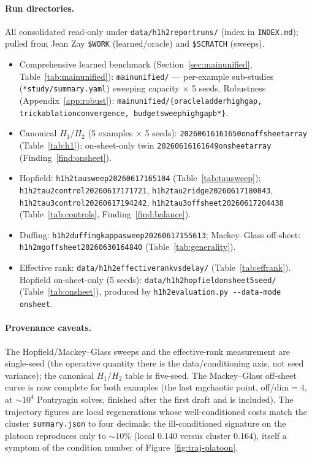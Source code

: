 \documentclass[11pt]{article}
\renewcommand{\_}{\discretionary{\textunderscore}{}{\textunderscore}}
\theoremstyle{plain}
\theoremstyle{definition}
\begin{document}
\paragraph{Run directories.} All consolidated read-only under \texttt{data/h1h2\_report\_runs/}
(index in \texttt{INDEX.md}); pulled from Jean Zay \texttt{\$WORK} (learned/oracle) and
\texttt{\$SCRATCH} (sweeps).
\begin{itemize}\setlength{\itemsep}{1pt}
\item Comprehensive learned benchmark (Section~\ref{sec:mainunified},
Table~\ref{tab:mainunified}): \texttt{main\_unified/} --- per-example sub-studies
(\texttt{*\_study/summary.yaml}) sweeping capacity $\times$ 5 seeds. Robustness
(Appendix~\ref{app:robust}): \texttt{main\_unified/\{oracle\_ladder\_high\_gap,
trick\_ablation\_convergence, budget\_sweep\_high\_gap\_b*\}}.
\item Canonical $H_1/H_2$ (5 examples $\times$ 5 seeds): \texttt{20260616\_161650\_on\_off\_sheet\_array}
(Table~\ref{tab:h1}); on-sheet-only twin \texttt{20260616\_161649\_on\_sheet\_array}
(Finding~\ref{find:onsheet}).
\item Hopfield: \texttt{h1h2\_tau\_sweep\_20260617\_165104} (Table~\ref{tab:tausweep});
\texttt{h1h2\_tau2\_control\_20260617\_171721}, \texttt{h1h2\_tau2\_ridge\_20260617\_180843},
\texttt{h1h2\_tau3\_control\_20260617\_194242}, \texttt{h1h2\_tau3\_offsheet\_20260617\_204438}
(Table~\ref{tab:controls}, Finding~\ref{find:balance}).
\item Duffing: \texttt{h1h2\_duffing\_kappa\_sweep\_20260617\_155613}; Mackey--Glass off-sheet:
\texttt{h1h2\_mg\_offsheet\_20260630\_164840} (Table~\ref{tab:generality}).
\item Effective rank: \texttt{data/h1h2\_effective\_rank\_vs\_delay/} (Table~\ref{tab:effrank}).
Hopfield on-sheet-only (5 seeds): \texttt{data/h1h2\_hopfield\_onsheet\_5seed/}
(Table~\ref{tab:onsheet}), produced by \texttt{h1h2\_evaluation.py -\/-data-mode on\_sheet}.
\end{itemize}

\paragraph{Provenance caveats.} The Hopfield/Mackey--Glass sweeps and the effective-rank
measurement are single-seed (the operative quantity there is the data/conditioning axis, not seed
variance); the canonical $H_1/H_2$ table is five-seed. The Mackey--Glass off-sheet curve is now
complete for both examples (the last mg\_chaotic point, off/dim${}=4$, at $\sim10^{4}$ Pontryagin
solves, finished after the first draft and is included). The trajectory
figures are local regenerations whose well-conditioned costs
match the cluster \texttt{summary.json} to four decimals; the ill-conditioned signature on the
platoon reproduces only to ${\sim}10\%$ (local $0.140$ versus cluster $0.164$), itself a symptom
of the condition number of Figure~\ref{fig:traj-platoon}.
\end{document}
